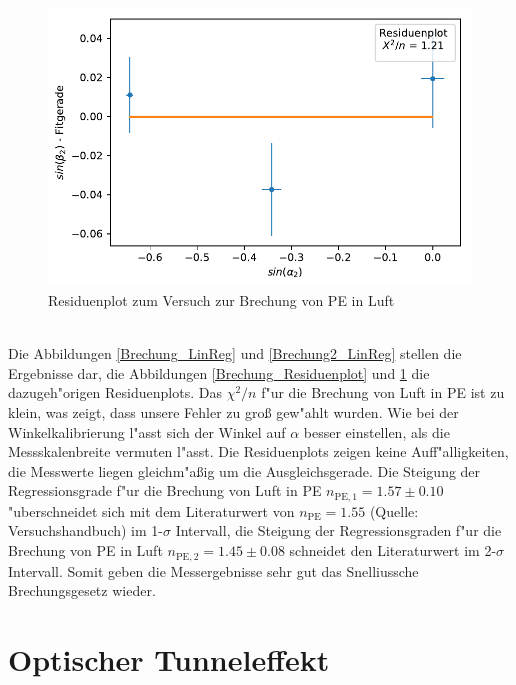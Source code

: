 \documentclass[12pt,a4paper]{article}
\begin{document}
\begin{figure}
	\centering
	\includegraphics[scale=1]{Bilder/Brechung_Residuen2.pdf}
	\caption{Residuenplot zum Versuch zur Brechung von PE in Luft}
	\label{Brechung2_Residuenplot}
\end{figure}
\\Die Abbildungen \ref{Brechung_LinReg} und \ref{Brechung2_LinReg} stellen die Ergebnisse dar, die Abbildungen \ref{Brechung_Residuenplot} und \ref{Brechung2_Residuenplot} die dazugeh"origen Residuenplots. Das $\chi^2/n$ f"ur die Brechung von Luft in PE ist zu klein, was zeigt, dass unsere Fehler zu groß gew"ahlt wurden. Wie bei der Winkelkalibrierung l"asst sich der Winkel auf $\alpha$ besser einstellen, als die Messskalenbreite vermuten l"asst. Die Residuenplots zeigen keine Auff"alligkeiten, die Messwerte liegen gleichm"a\ss ig um die Ausgleichsgerade. Die Steigung der Regressionsgrade f"ur die Brechung von Luft in PE $n_{\text{PE},1}=1.57\pm0.10$ "uberschneidet sich mit dem Literaturwert von $n_{\text{PE}}=1.55$ (Quelle: Versuchshandbuch) im 1-$\sigma$ Intervall, die Steigung der Regressionsgraden f"ur die Brechung von PE in Luft $n_{\text{PE},2}=1.45\pm0.08$ schneidet den Literaturwert im 2-$\sigma$ Intervall. Somit geben die Messergebnisse sehr gut das Snelliussche Brechungsgesetz wieder.
\newpage
\vphantom{v}
\newpage
\section{Optischer Tunneleffekt}
\end{document}
